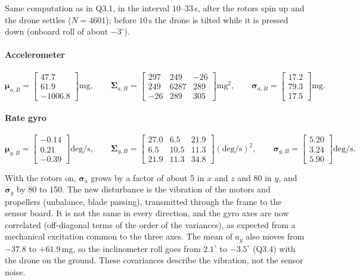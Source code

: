 \documentclass[10pt,a4paper]{article}
\newenvironment{answer}{%
  \begin{tcolorbox}[breakable,enhanced,colback=white,colframe=greyline,
    boxrule=0.6pt,arc=2pt,left=8pt,right=8pt,top=7pt,bottom=7pt,
    before skip=0pt,after skip=12pt]
}{\end{tcolorbox}}
\begin{document}
\begin{answer}
Same computation as in Q3.1, in the interval $10$--$33$\,s, after the
rotors spin up and the drone settles ($N=4601$); before $10$\,s the drone
is tilted while it is pressed down (onboard roll of about $-3^\circ$).

\paragraph{Accelerometer}
\[
\boldsymbol{\mu}_{a,B} =
\begin{bmatrix} 47.7\\ 61.9\\ -1006.8 \end{bmatrix}\mathrm{mg},
\qquad
\boldsymbol{\Sigma}_{a,B} =
\begin{bmatrix}
297 & 249 & -26\\
249 & 6287 & 289\\
-26 & 289 & 305
\end{bmatrix}\mathrm{mg}^2,
\qquad
\boldsymbol{\sigma}_{a,B} =
\begin{bmatrix} 17.2\\ 79.3\\ 17.5 \end{bmatrix}\mathrm{mg}.
\]

\paragraph{Rate gyro}
\[
\boldsymbol{\mu}_{g,B} =
\begin{bmatrix} -0.14\\ 0.21\\ -0.39 \end{bmatrix}\mathrm{deg/s},
\qquad
\boldsymbol{\Sigma}_{g,B} =
\begin{bmatrix}
27.0 & 6.5 & 21.9\\
6.5 & 10.5 & 11.3\\
21.9 & 11.3 & 34.8
\end{bmatrix}(\mathrm{deg/s})^2,
\qquad
\boldsymbol{\sigma}_{g,B} =
\begin{bmatrix} 5.20\\ 3.24\\ 5.90 \end{bmatrix}\mathrm{deg/s}.
\]

With the rotors on, $\boldsymbol{\sigma}_a$ grows by a factor of about 5
in $x$ and $z$ and 80 in $y$, and $\boldsymbol{\sigma}_g$ by 80 to 150.
The new disturbance is the vibration of the motors and propellers
(unbalance, blade passing), transmitted through the frame to the sensor
board. It is not the same in every direction, and the gyro axes are now
correlated (off-diagonal terms of the order of the variances), as
expected from a mechanical excitation common to the three axes. The mean
of $a_y$ also moves from $-37.8$ to $+61.9$\,mg, so the inclinometer
roll goes from $2.1^\circ$ to $-3.5^\circ$ (Q3.4) with the drone on the
ground. These covariances describe the vibration, not the sensor noise.
\end{answer}
\end{document}
